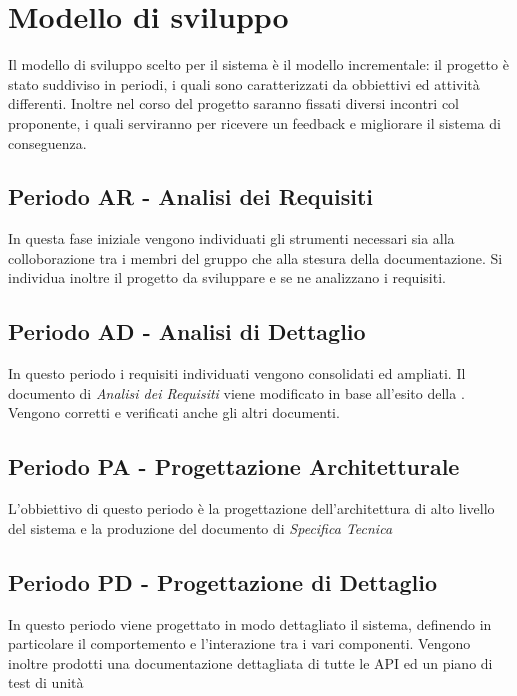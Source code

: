 \documentclass[./PianoDiProgetto.tex]{subfiles}
\begin{document}
  \section{Modello di sviluppo}

  Il modello di sviluppo scelto per il sistema è il modello incrementale: il
  progetto è stato suddiviso in periodi, i quali sono caratterizzati da
  obbiettivi ed attività differenti. Inoltre nel corso del progetto saranno
  fissati diversi incontri col proponente, i quali serviranno per ricevere un
  feedback e migliorare il sistema di conseguenza.

  \subsection{Periodo AR - Analisi dei Requisiti}

  In questa fase iniziale vengono individuati gli strumenti necessari sia alla
  colloborazione tra i membri del gruppo che alla stesura della documentazione.
  Si individua inoltre il progetto da sviluppare e se ne analizzano i requisiti.

  \subsection{Periodo AD - Analisi di Dettaglio}

  In questo periodo i requisiti individuati vengono consolidati ed ampliati. Il
  documento di \textit{Analisi dei Requisiti} viene modificato in base all'esito
  della \RR. Vengono corretti e verificati anche gli altri documenti.

  \subsection{Periodo PA - Progettazione Architetturale}

  L'obbiettivo di questo periodo è la progettazione dell'architettura di alto
  livello del sistema e la produzione del documento di \textit{Specifica Tecnica}

  \subsection{Periodo PD - Progettazione di Dettaglio}

  In questo periodo viene progettato in modo dettagliato il sistema, definendo
  in particolare il comportemento e l'interazione tra i vari componenti. Vengono
  inoltre prodotti una documentazione dettagliata di tutte le API ed un piano
  di test di unità
\end{document}
